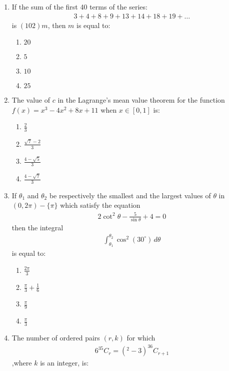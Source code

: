 \documentclass{article}
\begin{document}
\begin{enumerate}
\item If the sum of the first 40 terms of the series:\begin{align*}3 + 4 + 8 + 9 + 13 + 14 + 18 + 19 + \dots\end{align*}is $(102)m$, then $m$ is equal to:
    
\begin{enumerate}
   \item $20$
   \item $5$
   \item $10$
   \item $25$
\end{enumerate}

\item The value of $c$ in the Lagrange's mean value theorem for the function $f(x) = x^3 - 4x^2 + 8x + 11$ when $x \in [0, 1]$ is:

\begin{enumerate}
   \item $\frac{2}{3}$
   \item $\frac{\sqrt{7} - 2}{3}$
   \item $\frac{4 - \sqrt{5}}{3}$
   \item $\frac{4 - \sqrt{7}}{3}$
\end{enumerate}

\item If $\theta_1$ and $\theta_2$ be respectively the smallest and the largest values of $\theta$ in $(0, 2\pi) - \{\pi\}$ which satisfy the equation \begin{align*}2\cot^2 \theta - \frac{5}{\sin \theta} + 4 = 0\end{align*}then the integral\begin{align*}\int_{\theta_1}^{\theta_2} \cos^2(30^\circ) \, d\theta\end{align*}is equal to:

\begin{enumerate}
   \item $\frac{2\pi}{3}$
   \item $\frac{\pi}{3} + \frac{1}{6}$
   \item $\frac{\pi}{9}$
   \item $\frac{\pi}{3}$
\end{enumerate}

\item The number of ordered pairs $(r, k)$ for which \begin{align*}6^{35} C_r = (^2 - 3)^{36} C_{r+1} \end{align*},where $k$ is an integer, is:


\end{enumerate}
\end{document}
